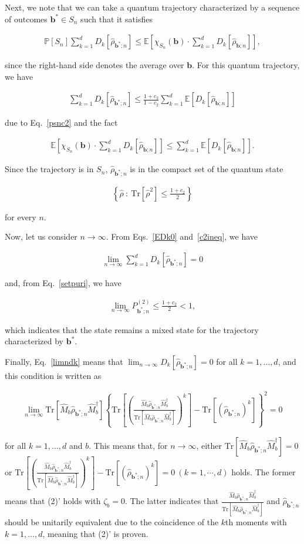 \documentclass[preprint,pteplogo]{ptephy_v2}%
\numberwithin{equation}{section}
\theoremstyle{definition}
\newcommand{\mr}[1]{\mathrm{#1}}
\newcommand{\mbb}[1]{\mathbb{#1}}
\newcommand{\lrs}[1]{\left( #1 \right)}
\newcommand{\lrm}[1]{{\left\{ #1 \right\}}}
\newcommand{\lrl}[1]{\left[ #1 \right]}
\newcommand{\aln}[1]{
\begin{align}
#1
\end{align}
}
\newcommand{\ra}{\rightarrow}
\newcommand{\Tr}{\mr{Tr}}
\begin{document}
Next, we note that we can take a quantum trajectory characterized by a sequence of outcomes $\bm{b}^* \in S_n$ such that it satisfies
\aln{
\mbb{P}[S_n]\sum_{k=1}^d{D_k[\hat{\rho}_{\bm{b}^*;n}]}
\leq\mbb{E}\lrl{\chi_{S_n}(\bm{b})\cdot\sum_{k=1}^d{D_k[\hat{\rho}_{\bm{b};n}]}},
}
since the right-hand side denotes the average over $\bm{b}$.
For this quantum trajectory, we have
\aln{\label{c2ineq}
\sum_{k=1}^d{D_k[\hat{\rho}_{\bm{b}^*;n}]}\leq \frac{1+c_2}{1-c_2}\sum_{k=1}^d{\mbb{E}\lrl{D_k[\hat{\rho}_{\bm{b};n}]}}
}
due to Eq.~\eqref{psnc2} and the fact
\aln{
\mbb{E}\lrl{\chi_{S_n}(\bm{b})\cdot\sum_{k=1}^d{D_k[\hat{\rho}_{\bm{b};n}]}}
\leq\sum_{k=1}^d{\mbb{E}\lrl{D_k[\hat{\rho}_{\bm{b};n}]}}.
}
Since the trajectory is in $S_n$, $\hat{\rho}_{\bm{b}^*;n}$ is in the compact set of the quantum state
\aln{\label{setpuri}
\lrm{\hat{\rho}\: : \:\Tr[\hat{\rho}^2]\leq \frac{1+c_2}{2}}
}
for every $n$.

Now, let us consider $n\ra\infty$. 
From Eqs.~\eqref{EDk0} and~\eqref{c2ineq}, we have
\aln{\label{limndk}
\lim_{n\ra\infty}\sum_{k=1}^d{D_k[\hat{\rho}_{\bm{b}^*;n}]}=0
}
and, from Eq.~\eqref{setpuri}, we have
\aln{
\lim_{n\ra\infty}P_{\bm{b}^*;n}^{(2)}\leq \frac{1+c_2}{2}<1, 
}
which indicates that the state remains a mixed state for the trajectory characterized by $\bm{b}^*$.

Finally, Eq.~\eqref{limndk} means that $\lim_{n\ra\infty}{D_k[\hat{\rho}_{\bm{b}^*;n}]}=0$
for all $k=1,\ldots,d$, and this condition is written as
\aln{
\lim_{n\ra\infty}\Tr\lrl{\hat{M}_b\hat{\rho}_{\bm{b}^*;n}\hat{M}_b^\dag}\lrm{\Tr\lrl{\lrs{\frac{\hat{M}_b\hat{\rho}_{\bm{b}^*;n}\hat{M}_b^\dag}{\Tr\lrl{\hat{M}_b\hat{\rho}_{\bm{b}^*;n}\hat{M}_b^\dag}}}^k}-\Tr\lrl{\lrs{\hat{\rho}_{\bm{b}^*;n}}^k}}^2=0
}
for all $k=1,\ldots,d$ and $b$.
This means that, for $n\ra\infty$, either $\Tr\lrl{\hat{M}_b\hat{\rho}_{\bm{b}^*;n}\hat{M}_b^\dag}=0$ or $\Tr\lrl{\lrs{\frac{\hat{M}_b\hat{\rho}_{\bm{b}^*;n}\hat{M}_b^\dag}{\Tr\lrl{\hat{M}_b\hat{\rho}_{\bm{b}^*;n}\hat{M}_b^\dag}}}^k}-\Tr\lrl{\lrs{\hat{\rho}_{\bm{b}^*;n}}^k}=0\:(k=1,\cdots, d)$ holds. 
The former means that (2)' holds with $\zeta_b=0$.
The latter indicates that $\frac{\hat{M}_b\hat{\rho}_{\bm{b}^*;n}\hat{M}_b^\dag}{\Tr\lrl{\hat{M}_b\hat{\rho}_{\bm{b}^*;n}\hat{M}_b^\dag}}$ and $\hat{\rho}_{\bm{b}^*;n}$ should be unitarily equivalent due to the coincidence of the $k$th moments with $k=1,\ldots, d$, meaning that (2)' is proven.
\end{document}
